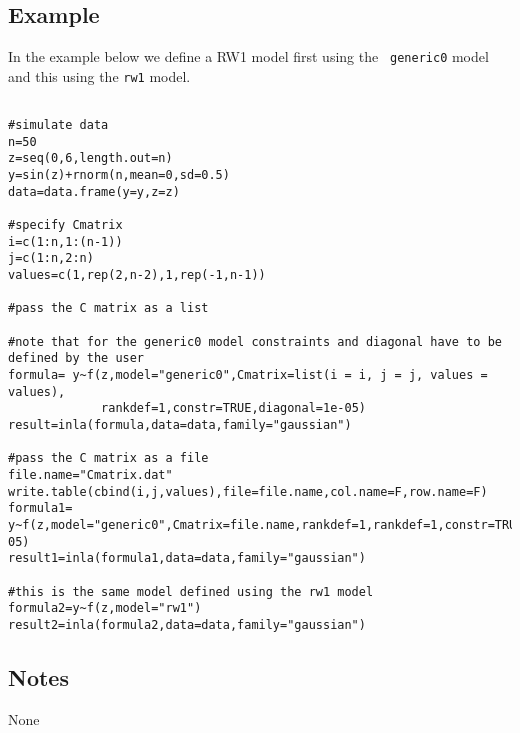\documentclass[a4paper,11pt]{article}
\begin{document}
\subsection*{Example}
In the example below we define a RW1 model first using the {\tt
    generic0} model and this using the {\tt rw1} model.
\begin{verbatim}

#simulate data
n=50
z=seq(0,6,length.out=n)
y=sin(z)+rnorm(n,mean=0,sd=0.5)
data=data.frame(y=y,z=z)

#specify Cmatrix
i=c(1:n,1:(n-1))
j=c(1:n,2:n)
values=c(1,rep(2,n-2),1,rep(-1,n-1))

#pass the C matrix as a list

#note that for the generic0 model constraints and diagonal have to be defined by the user
formula= y~f(z,model="generic0",Cmatrix=list(i = i, j = j, values = values),
             rankdef=1,constr=TRUE,diagonal=1e-05)
result=inla(formula,data=data,family="gaussian")

#pass the C matrix as a file
file.name="Cmatrix.dat"
write.table(cbind(i,j,values),file=file.name,col.name=F,row.name=F)
formula1= y~f(z,model="generic0",Cmatrix=file.name,rankdef=1,rankdef=1,constr=TRUE,diagonal=1e-05)
result1=inla(formula1,data=data,family="gaussian")

#this is the same model defined using the rw1 model
formula2=y~f(z,model="rw1")
result2=inla(formula2,data=data,family="gaussian")

\end{verbatim}

\subsection*{Notes}
None
\end{document}
